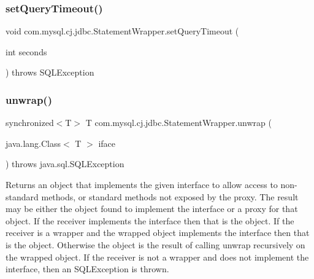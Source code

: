 \mbox{\label{classcom_1_1mysql_1_1cj_1_1jdbc_1_1_statement_wrapper_a26f8947b44321bdf8d810ff448e22be6}} 
\subsubsection{\texorpdfstring{set\+Query\+Timeout()}{setQueryTimeout()}}
{\footnotesize\ttfamily void com.\+mysql.\+cj.\+jdbc.\+Statement\+Wrapper.\+set\+Query\+Timeout (\begin{DoxyParamCaption}\item[{int}]{seconds }\end{DoxyParamCaption}) throws S\+Q\+L\+Exception}

\mbox{\label{classcom_1_1mysql_1_1cj_1_1jdbc_1_1_statement_wrapper_ab5729968dd5a079a6fabb69c3e1dde40}} 
\subsubsection{\texorpdfstring{unwrap()}{unwrap()}}
{\footnotesize\ttfamily synchronized$<$T$>$ T com.\+mysql.\+cj.\+jdbc.\+Statement\+Wrapper.\+unwrap (\begin{DoxyParamCaption}\item[{java.\+lang.\+Class$<$ T $>$}]{iface }\end{DoxyParamCaption}) throws java.\+sql.\+S\+Q\+L\+Exception}

Returns an object that implements the given interface to allow access to non-\/standard methods, or standard methods not exposed by the proxy. The result may be either the object found to implement the interface or a proxy for that object. If the receiver implements the interface then that is the object. If the receiver is a wrapper and the wrapped object implements the interface then that is the object. Otherwise the object is the result of calling {\ttfamily unwrap} recursively on the wrapped object. If the receiver is not a wrapper and does not implement the interface, then an {\ttfamily S\+Q\+L\+Exception} is thrown.


